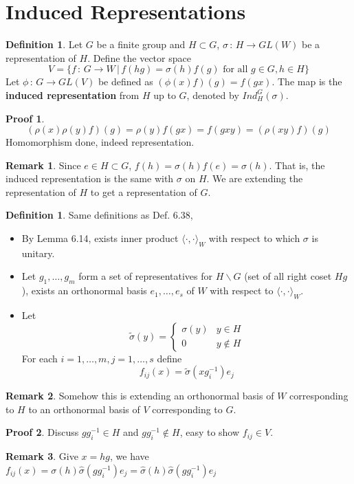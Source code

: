 \documentclass{book}
\newcommand{\define}[1]{\textbf{#1}}
\newcommand{\inner}[1]{\langle #1 \rangle}
\theoremstyle{definition}
\newtheorem{definition}[lemma]{Definition}
\theoremstyle{remarkstyle}
\newtheorem*{remark}{Remark}%
\newtheorem*{myproof}{Proof}%
\begin{document}
\section{Induced Representations}
\begin{definition}
    Let $G$ be a finite group and $H\subset G$, $\sigma\,:\,H\rightarrow GL(W)$ be a representation of $H$. Define the vector space 
    $$
    V = \{f\,:\,G\rightarrow W\,\lvert\, f(hg)=\sigma(h)f(g) \textrm{ for all $g\in G, h\in H$}\}
    $$
    Let $\phi\,:\,G\rightarrow GL(V)$ be defined as $(\phi(x)f)(g)=f(gx)$. The map is the \define{induced representation} from $H$ up to $G$, denoted by $Ind^G_H(\sigma)$.
\end{definition}
\begin{myproof}
    $$
    (\rho(x)\rho(y)f)(g) = \rho(y)f(gx) = f(gxy) = (\rho(xy)f)(g)
    $$
    Homomorphism done, indeed representation.
\end{myproof}
\begin{remark}
    Since $e\in H\subset G$, $f(h)=\sigma(h)f(e)=\sigma(h)$. That is, the induced representation is the same with $\sigma$ on $H$. We are extending the representation of $H$ to get a representation of $G$. \newline
\end{remark}

\begin{definition}
Same definitions as Def. 6.38, 
    \begin{itemize}
        \item By Lemma 6.14, exists inner product $\inner{\cdot,\cdot}_W$ with respect to which $\sigma$ is unitary. 
        \item Let $g_1,\dots,g_m$ form a set of representatives for $H\backslash G$ (set of all right coset $Hg$), exists an orthonormal basis $e_1,\dots,e_s$ of $W$ with respect to $\inner{\cdot,\cdot}_W$. 
        \item Let 
        $$
        \tilde{\sigma}(y) = \left\{
        \begin{array}{ll}
            \sigma(y) & y\in H  \\
            0 & y \notin H 
        \end{array}
        \right.
        $$
        For each $i = 1,\dots, m, j= 1, \dots, s$ define 
        $$
        f_{ij}(x)=\tilde{\sigma}(xg^{-1}_i)e_j
        $$
    \end{itemize}
\end{definition}
\begin{remark}
    Somehow this is extending an orthonormal basis of $W$ corresponding to $H$ to an orthonormal basis of $V$ corresponding to $G$.
\end{remark}
\begin{myproof}
    Discuss $gg_i^{-1} \in H$ and $gg_i^{-1} \notin H$, easy to show $f_{ij} \in V $.
\end{myproof}
\begin{remark}
    Give $x=hg$, we have $f_{ij}(x) = \sigma(h)\hat{\sigma}(gg^{-1}_i)e_j = \hat{\sigma}(h)\hat{\sigma}(gg^{-1}_i)e_j $ \newline
\end{remark}
\end{document}
